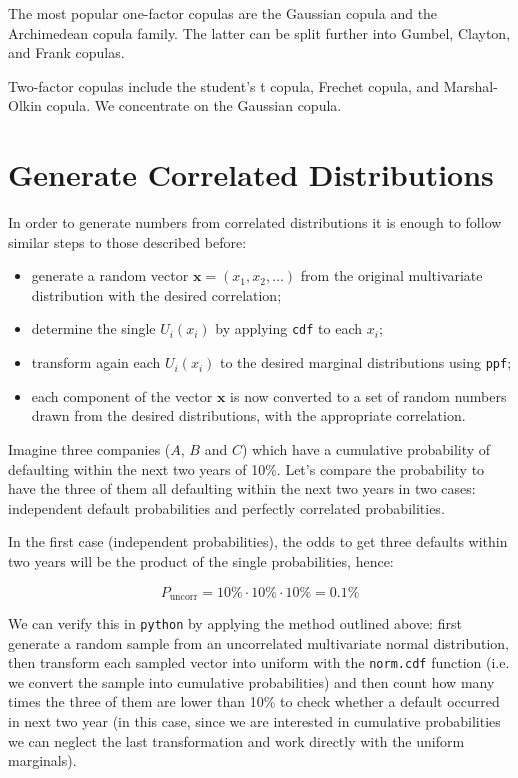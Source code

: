 The most popular one-factor copulas are the Gaussian copula and the Archimedean copula family. The latter can be split further into Gumbel, Clayton, and Frank copulas.

Two-factor copulas include the student’s t copula, Frechet copula, and Marshal-Olkin copula. We concentrate on the Gaussian copula.

\section{Generate Correlated Distributions}
\label{generate-correlated-distributions}

In order to generate numbers from correlated distributions it is enough to follow similar steps to those described before:

\begin{itemize}
\tightlist
\item
  generate a random vector \(\mathbf{x}=(x_1, x_2,\ldots)\) from the
  original multivariate distribution with the desired correlation;
\item
  determine the single \(U_i(x_i)\) by applying \texttt{cdf} to each
  \(x_i\);
\item
  transform again each \(U_i(x_i)\) to the desired marginal
  distributions using \texttt{ppf};
\item
  each component of the vector \(\mathbf{x}\) is now converted to a set
  of random numbers drawn from the desired distributions, with the
  appropriate correlation.
\end{itemize}

Imagine three companies ($A$, $B$ and $C$) which have a cumulative probability of defaulting within the next two years of 10\%.
Let's compare the probability to have the three of them all defaulting within the next two years in two cases: independent default probabilities and perfectly correlated probabilities.

In the first case (independent probabilities), the odds to get three defaults within two years will be the product of the single probabilities, hence:

\[P_{\mathrm{uncorr}} = 10\% \cdot 10\% \cdot 10\% = 0.1 \%\]

We can verify this in \texttt{python} by applying the method outlined above: first generate a random sample from an uncorrelated multivariate normal distribution, then transform each sampled vector into uniform with the \texttt{norm.cdf} function (i.e. we convert the sample into cumulative probabilities) and then count how many times the three of them are lower than 10\% to check whether a default occurred in next two year (in this case, since we are interested in cumulative probabilities we can neglect the last transformation and work directly with the uniform marginals).

